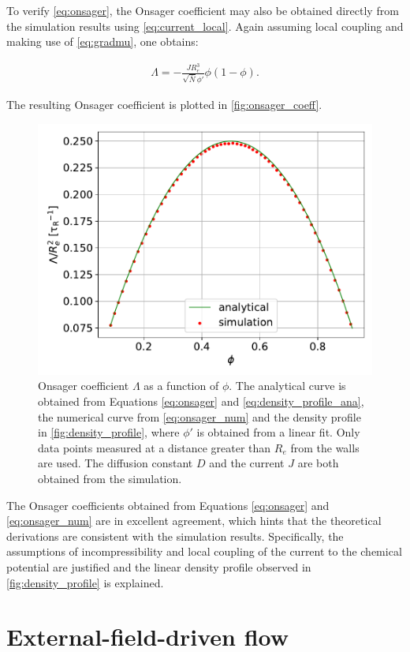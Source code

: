 \documentclass[bachelor,       %
               oneside,        %
               BCOR10mm,       %
               ngerman, english %
               ]{GAUBM}
\begin{document}
To verify \autoref{eq:onsager}, the Onsager coefficient may also be obtained directly from the simulation results using \autoref{eq:current_local}. Again assuming local coupling and making use of \autoref{eq:gradmu}, one obtains:

\begin{align}
  \Lambda=-\frac{JR_e^3}{\sqrt{\bar N}\phi'}\phi(1-\phi).
  \label{eq:onsager_num}
\end{align}

The resulting Onsager coefficient is plotted in \autoref{fig:onsager_coeff}.

\begin{figure}[h]
  \centering
  \includegraphics[width=0.6\linewidth]{figures/onsager_coll_diff.pdf}
  \caption{Onsager coefficient $\Lambda$ as a function of $\phi$. The analytical curve is obtained from Equations \eqref{eq:onsager} and \eqref{eq:density_profile_ana}, the numerical curve from \autoref{eq:onsager_num} and the density profile in \autoref{fig:density_profile}, where $\phi'$ is obtained from a linear fit. Only data points measured at a distance greater than $R_e$ from the walls are used. The diffusion constant $D$ and the current $J$ are both obtained from the simulation.}
  \label{fig:onsager_coeff}
\end{figure}

The Onsager coefficients obtained from Equations \eqref{eq:onsager} and \eqref{eq:onsager_num} are in excellent agreement, which hints that the theoretical derivations are consistent with the simulation results. 
Specifically, the assumptions of incompressibility and local coupling of the current to the chemical potential are justified and the linear density profile observed in \autoref{fig:density_profile} is explained.


\chapter{External-field-driven flow}
\end{document}
